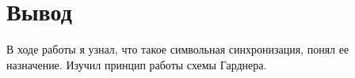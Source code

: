 \chapter{Вывод}
\label{ch:chap3}

В ходе работы я узнал, что такое символьная синхронизация, понял ее назначение. Изучил принцип работы схемы Гарднера.
\endinput